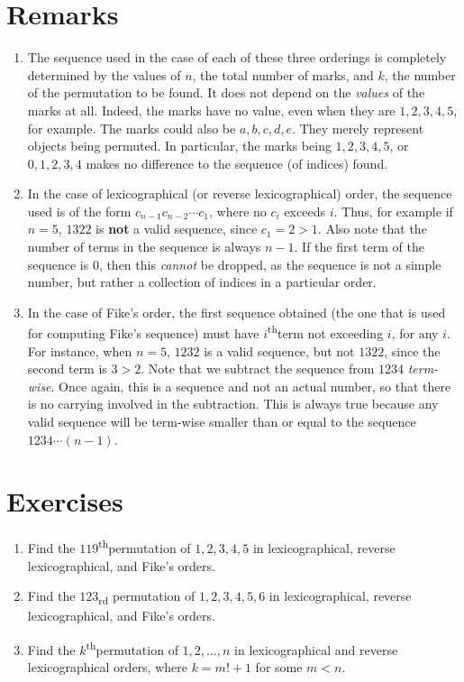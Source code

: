 \documentclass[svgnames]{article}
\renewcommand{\th}{\textsuperscript{th}}
\begin{document}
\section*{Remarks}
\begin{enumerate}
\item The sequence used in the case of each of these three orderings is completely determined by the values of $n$, the total number of marks, and $k$, the number of the permutation to be found. It does not depend on the \emph{values} of the marks at all. Indeed, the marks have no value, even when they are $1, 2, 3, 4, 5$, for example. The marks could also be $a, b, c, d, e$. They merely represent objects being permuted. In particular, the marks being $1, 2, 3, 4, 5$, or $0, 1, 2, 3, 4$ makes no difference to the sequence (of indices) found.
\item In the case of lexicographical (or reverse lexicographical) order, the sequence used is of the form $c_{n-1}c_{n-2} \cdots c_1$, where no $c_i$ exceeds $i$. Thus, for example if $n = 5$, $1322$ is \textbf{not} a valid sequence, since $c_1 = 2 > 1$. Also note that the number of terms in the sequence is always $n - 1$. If the first term of the sequence is $0$, then this \emph{cannot} be dropped, as the sequence is not a simple number, but rather a collection of indices in a particular order.
\item In the case of Fike's order, the first sequence obtained (the one that is used for computing Fike's sequence) must have $i$\th term not exceeding $i$, for any $i$. For instance, when $n = 5$, $1232$ is a valid sequence, but not $1322$, since the second term is $3 > 2$. Note that we subtract the sequence from $1234$ \emph{term-wise}. Once again, this is a sequence and not an actual number, so that there is no carrying involved in the subtraction. This is always true because any valid sequence will be term-wise smaller than or equal to the sequence $1234\cdots(n-1)$.
\end{enumerate}

\section*{Exercises}
\begin{enumerate}
\item Find the $119$\th permutation of $1, 2, 3, 4, 5$ in lexicographical, reverse lexicographical, and Fike's orders.
\item Find the $123$\textsubscript{rd} permutation of $1, 2, 3, 4, 5, 6$ in lexicographical, reverse lexicographical, and Fike's orders.
\item Find the $k$\th permutation of $1, 2, \ldots, n$ in lexicographical and reverse lexicographical orders, where $k = m! + 1$ for some $m < n$.
\end{enumerate}
\end{document}
